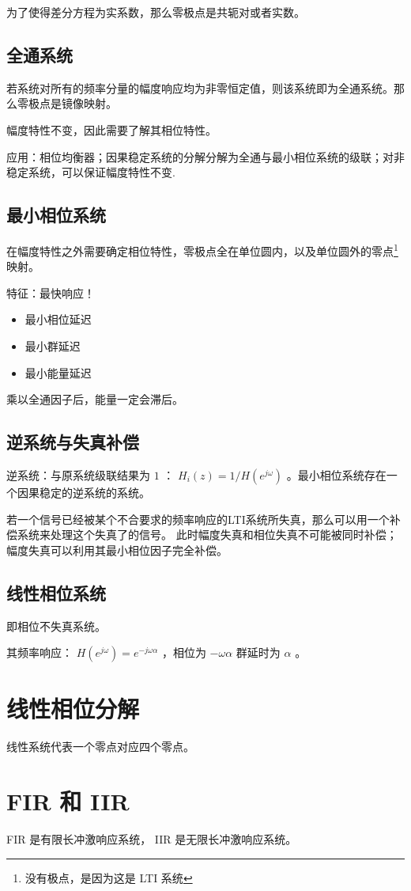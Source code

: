 \documentclass[cn,11pt,chinese,black,simple]{../elegantbook}
\begin{document}
为了使得差分方程为实系数，那么零极点是共轭对或者实数。

\subsection{全通系统}

若系统对所有的频率分量的幅度响应均为非零恒定值，则该系统即为全通系统。那么零极点是镜像映射。

幅度特性不变，因此需要了解其相位特性。

应用：相位均衡器；因果稳定系统的分解分解为全通与最小相位系统的级联；对非稳定系统，可以保证幅度特性不变.

\subsection{最小相位系统}

在幅度特性之外需要确定相位特性，零极点全在单位圆内，以及单位圆外的零点\footnote{没有极点，是因为这是 LTI 系统}映射。

特征：最快响应！
\begin{itemize}
    \item 最小相位延迟
    \item 最小群延迟
    \item 最小能量延迟
\end{itemize}

乘以全通因子后，能量一定会滞后。

\subsection{逆系统与失真补偿}

逆系统：与原系统级联结果为 \(1\) ： \(H_i(z) = 1 / H(e^{j\omega})\) 。最小相位系统存在一个因果稳定的逆系统的系统。

若一个信号已经被某个不合要求的频率响应的LTI系统所失真，那么可以用一个补偿系统来处理这个失真了的信号。
此时幅度失真和相位失真不可能被同时补偿；幅度失真可以利用其最小相位因子完全补偿。

\subsection{线性相位系统}

即相位不失真系统。

其频率响应： \(H(e^{j\omega}) = e^{-j\omega \alpha}\) ，相位为 \(-\omega \alpha\) 群延时为 \(\alpha\) 。


\section{线性相位分解}

线性系统代表一个零点对应四个零点。

\section{FIR 和 IIR} 

FIR 是有限长冲激响应系统， IIR 是无限长冲激响应系统。


\let\chapname\undefined
\ifx\mainclass\undefined
\end{document}
